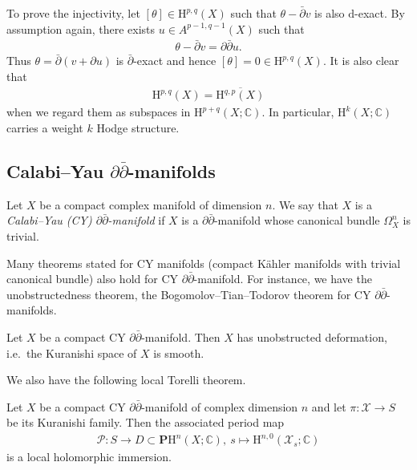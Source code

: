 To prove the injectivity, let \([\theta]\in\mathrm{H}^{p,q}(X)\)
such that \(\theta-\bar{\partial}v\) is also \(\mathrm{d}\)-exact.
By assumption again, there exists \(u\in A^{p-1,q-1}(X)\) such that
\begin{eqnarray*}
\theta-\bar{\partial}v = \partial\bar{\partial}u.
\end{eqnarray*}
Thus \(\theta = \bar{\partial}(v+\partial u)\) is \(\bar{\partial}\)-exact
and hence \([\theta]=0\in \mathrm{H}^{p,q}(X)\).
It is also clear that 
\begin{eqnarray*}
\mathrm{H}^{p,q}(X) = \overline{\mathrm{H}^{q,p}(X)}
\end{eqnarray*}
when we regard them as subspaces in \(\mathrm{H}^{p+q}(X;\mathbb{C})\). In particular, 
\(\mathrm{H}^{k}(X;\mathbb{C})\) carries a weight \(k\) Hodge structure.



\subsection{Calabi--Yau \(\partial\bar{\partial}\)-manifolds}
\begin{definition}
Let \(X\) be a compact complex manifold of dimension \(n\). We
say that \(X\) is a \emph{Calabi--Yau (CY) \(\partial\bar{\partial}\)-manifold}
if \(X\) is a \(\partial\bar{\partial}\)-manifold whose 
canonical bundle \(\Omega^{n}_{X}\) is trivial.
\end{definition}
Many theorems stated for CY manifolds (compact K\"{a}hler manifolds with
trivial canonical bundle) also hold for CY \(\partial\bar{\partial}\)-manifold.
For instance, we have the unobstructedness theorem, 
the Bogomolov--Tian--Todorov theorem for CY \(\partial\bar{\partial}\)-manifolds.
\begin{theorem}
Let \(X\) be a compact CY \(\partial\bar{\partial}\)-manifold.
Then \(X\) has unobstructed deformation, i.e.~the Kuranishi space of \(X\) is smooth.
\end{theorem}
We also have the following local Torelli theorem.
\begin{theorem}
Let \(X\) be a compact CY \(\partial\bar{\partial}\)-manifold of
complex dimension \(n\) and let \(\pi\colon\mathcal{X}\to S\) be its 
Kuranishi family. Then the associated period map
\begin{eqnarray*}
\mathcal{P}\colon S\to D\subset\mathbf{P}\mathrm{H}^{n}(X;\mathbb{C}),~
s\mapsto \mathrm{H}^{n,0}(\mathcal{X}_{s};\mathbb{C})
\end{eqnarray*}
is a local holomorphic immersion.
\end{theorem}

